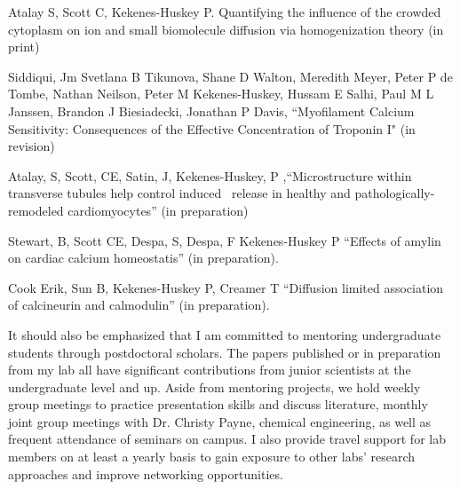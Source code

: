 \item Atalay S, Scott C, Kekenes-Huskey P. Quantifying the influence of the crowded cytoplasm on ion and small biomolecule diffusion via homogenization theory (in print)
\item Siddiqui, Jm Svetlana B Tikunova, Shane D Walton, Meredith Meyer, Peter P de Tombe, Nathan Neilson, Peter M Kekenes-Huskey, Hussam E Salhi, Paul M L Janssen, Brandon J Biesiadecki, Jonathan P Davis, “Myofilament Calcium Sensitivity:  Consequences of the Effective Concentration of Troponin I" (in revision)
\item Atalay, S, Scott, CE, Satin, J, Kekenes-Huskey, P ,“Microstructure within transverse tubules help control \catwo\-induced \catwo\ release in healthy and pathologically-remodeled cardiomyocytes” (in preparation)
\item Stewart, B, Scott CE, Despa, S, Despa, F Kekenes-Huskey P “Effects of amylin on cardiac calcium homeostatis” (in preparation). 
\item Cook Erik, Sun B, Kekenes-Huskey P, Creamer T “Diffusion limited association of calcineurin and calmodulin” (in preparation). 
\len

It should also be emphasized that I am committed to mentoring undergraduate students through postdoctoral scholars. 
The papers published or in preparation from my lab all have significant contributions from junior scientists at the undergraduate level and up.  
Aside from mentoring projects, we hold weekly group meetings to practice presentation skills and discuss literature, monthly joint group meetings with Dr. Christy Payne, chemical engineering, as well as frequent attendance of seminars on campus. 
I also provide travel support for lab members on at least a yearly basis to gain exposure to other labs’ research approaches and improve networking opportunities. 


